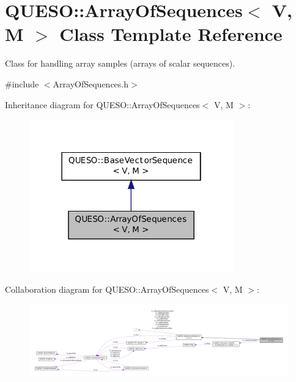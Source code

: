 \hypertarget{class_q_u_e_s_o_1_1_array_of_sequences}{\section{Q\-U\-E\-S\-O\-:\-:Array\-Of\-Sequences$<$ V, M $>$ Class Template Reference}
\label{class_q_u_e_s_o_1_1_array_of_sequences}
}


Class for handling array samples (arrays of scalar sequences).  




{\ttfamily \#include $<$Array\-Of\-Sequences.\-h$>$}



Inheritance diagram for Q\-U\-E\-S\-O\-:\-:Array\-Of\-Sequences$<$ V, M $>$\-:
\nopagebreak
\begin{figure}[H]
\begin{center}
\leavevmode
\includegraphics[width=250pt]{class_q_u_e_s_o_1_1_array_of_sequences__inherit__graph}
\end{center}
\end{figure}


Collaboration diagram for Q\-U\-E\-S\-O\-:\-:Array\-Of\-Sequences$<$ V, M $>$\-:
\nopagebreak
\begin{figure}[H]
\begin{center}
\leavevmode
\includegraphics[width=350pt]{class_q_u_e_s_o_1_1_array_of_sequences__coll__graph}
\end{center}
\end{figure}

